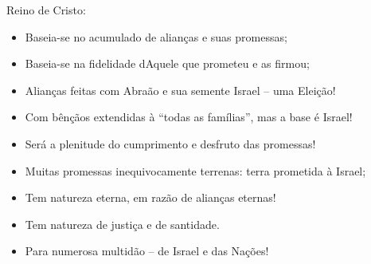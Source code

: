 \documentclass[12pt,aspectratio=169]{beamer}
\newcommand{\ORA}[1]{{\textcolor{TXred!50!TXyel}{#1}}}
\newcommand{\YEL}[1]{{\textcolor{TXyel}{#1}}}
\newcommand{\GRE}[1]{{\textcolor{TXgre}{#1}}}
\newcommand{\CYA}[1]{{\textcolor{TXcya}{#1}}}
\newcommand{\BLU}[1]{{\textcolor{TXblu}{#1}}}
\newcommand{\MAG}[1]{{\textcolor{TXmag}{#1}}}
\begin{document}
    \begin{frame}{\YEL{Reino de Cristo}:}
        \begin{itemize}
            \item<1-> Baseia-se no \YEL{acumulado} de \GRE{alianças} e suas \ORA{promessas};
            \item<2-> Baseia-se na \CYA{fidelidade} dAquele que prometeu e as firmou;
            \item<3-> Alianças feitas com Abraão e sua semente \BLU{Israel} -- uma \YEL{Eleição}!
            \item<4-> Com bênçãos extendidas à ``\YEL{todas as famílias}'', mas a base é
                \BLU{Israel}!
            \item<5-> Será a \YEL{plenitude do cumprimento} e desfruto das promessas!
            \item<6-> Muitas promessas inequivocamente \ORA{terrenas}: \ORA{terra} prometida à
                \BLU{Israel};
            \item<7-> Tem natureza \MAG{eterna}, em razão de alianças \MAG{eternas}!
            \item<8-> Tem natureza de \YEL{justiça} e de \YEL{santidade}.
            \item<9-> Para \GRE{numerosa multidão} -- de \BLU{Israel} e das Nações!
        \end{itemize}
    \end{frame}

\end{document}
